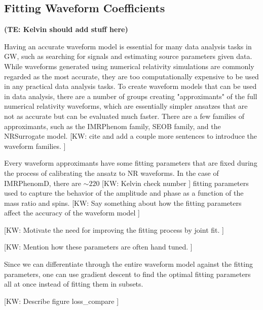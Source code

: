 \documentclass[twocolumn]{aastex631}
\newcommand{\te}[1]{\textbf{\color{pyGreen}(TE: #1)}}
\newcommand{\kw}[1]{{\color{rb4}[KW: #1 ]}}
\begin{document}
\subsection{Fitting Waveform Coefficients}
\label{subsec:coeffs}

\te{Kelvin should add stuff here}

Having an accurate waveform model is essential for many data analysis tasks in
GW, such as searching for signals and estimating source parameters given data.
While waveforms generated using numerical relativity simulations are commonly
regarded as the most accurate, they are too computationally expensive to be used
in any practical data analysis tasks. To create waveform models that can be used
in data analysis, there are a number of groups creating "approximants" of the
full numerical relativity waveforms, which are essentially simpler ansatzes that
are not as accurate but can be evaluated much faster. There are a few families
of approximants, such as the IMRPhenom family, SEOB family, and the NRSurrogate
model. \kw{cite and add a couple more sentences to introduce the waveform
families.}

Every waveform approximants have some fitting parameters that are fixed during
the process of calibrating the ansatz to NR waveforms. In the case of
IMRPhenomD, there are $\sim 220$ \kw{Kelvin check number} fitting parameters
used to capture the behavior of the amplitude and phase as a function of the
mass ratio and spins. \kw{Say something about how the fitting parameters affect the accuracy of the waveform model}

\kw{Motivate the need for improving the fitting process by joint fit.}

\kw{Mention how these parameters are often hand tuned.}

Since we can differentiate through the entire waveform model against the fitting
parameters, one can use gradient descent to find the optimal fitting parameters
all at once instead of fitting them in subsets.

\kw{Describe figure loss_compare}
\end{document}
